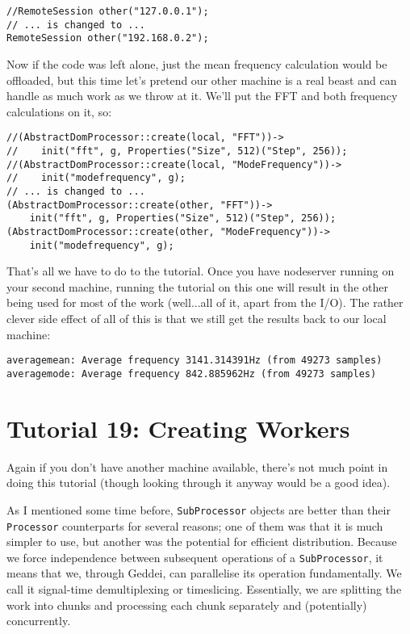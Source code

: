 \begin{verbatim}
//RemoteSession other("127.0.0.1");
// ... is changed to ...
RemoteSession other("192.168.0.2");
\end{verbatim}

Now if the code was left alone, just the mean frequency calculation would be offloaded, but this time let's pretend our other machine is a real beast and can handle as much work as we throw at it. We'll put the FFT and both frequency calculations on it, so:

\begin{verbatim}
//(AbstractDomProcessor::create(local, "FFT"))->
//    init("fft", g, Properties("Size", 512)("Step", 256));
//(AbstractDomProcessor::create(local, "ModeFrequency"))->
//    init("modefrequency", g);
// ... is changed to ...
(AbstractDomProcessor::create(other, "FFT"))->
    init("fft", g, Properties("Size", 512)("Step", 256));
(AbstractDomProcessor::create(other, "ModeFrequency"))->
    init("modefrequency", g);
\end{verbatim}

That's all we have to do to the tutorial. Once you have nodeserver running on your second machine, running the tutorial on this one will result in the other being used for most of the work (well...all of it, apart from the I/O). The rather clever side effect of all of this is that we still get the results back to our local machine:

\begin{verbatim}
averagemean: Average frequency 3141.314391Hz (from 49273 samples)
averagemode: Average frequency 842.885962Hz (from 49273 samples)
\end{verbatim}




\section{Tutorial 19: Creating Workers}

Again if you don't have another machine available, there's not much point in doing this tutorial (though looking through it anyway would be a good idea).

As I mentioned some time before, \texttt{SubProcessor} objects are better than their \texttt{Processor} counterparts for several reasons; one of them was that it is much simpler to use, but another was the potential for efficient distribution. Because we force independence between subsequent operations of a \texttt{SubProcessor}, it means that we, through Geddei, can parallelise its operation fundamentally. We call it signal-time demultiplexing or timeslicing. Essentially, we are splitting the work into chunks and processing each chunk separately and (potentially) concurrently.

